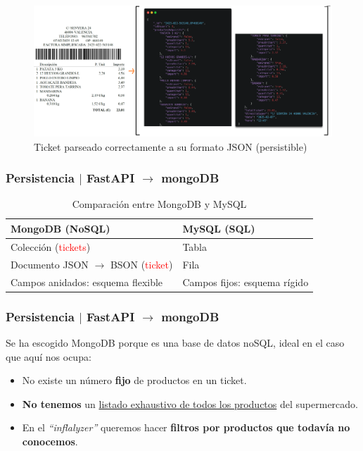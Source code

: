 \documentclass{beamer}
\begin{document}
	
	\begin{frame}

		\begin{figure}
			\centering
			\includegraphics[width=1\linewidth]{imgEspecifiques/ticketFinal}
			\caption{Ticket parseado correctamente a su formato JSON (persistible)}
			\label{fig:ticketFinal}
		\end{figure}
		
	\end{frame}
	
	
	
	\begin{frame}
		\frametitle{Persistencia $|$ FastAPI $\rightarrow$ mongoDB}
		

		\begin{table}[h!]
			\centering
			\begin{tabular}{|l|l|}
				\hline
				\textbf{MongoDB (NoSQL)} & \textbf{MySQL (SQL)} \\
				\hline
				Colección (\textcolor{red}{tickets})  & Tabla  \\
				Documento JSON $\rightarrow$ BSON (\textcolor{red}{ticket}) & Fila \\
				Campos anidados: esquema flexible & Campos fijos: esquema rígido \\
				\hline
			\end{tabular}
			\caption{Comparación entre MongoDB y MySQL}
		\end{table}
		
	\end{frame}
	
	\begin{frame}
		\frametitle{Persistencia $|$ FastAPI $\rightarrow$ mongoDB}
		Se ha escogido MongoDB porque es una base de datos noSQL, ideal en el caso que aquí nos ocupa:
		\begin{itemize}
			\item No existe un número \textbf{fijo} de productos en un ticket.
			\item \textbf{No tenemos} un \underline{listado exhaustivo de todos los productos} del supermercado.
			\item En el \textit{``inflalyzer''} queremos hacer \textbf{filtros por productos que todavía no conocemos}.
		\end{itemize}
	\end{frame}
	
\end{document}
